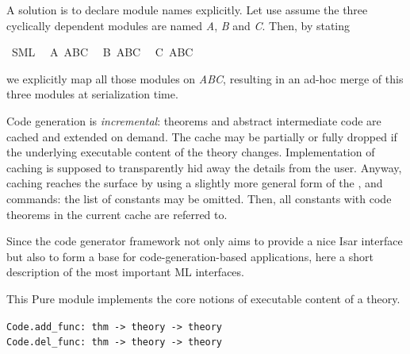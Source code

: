 \begin{isabellebody}
\begin{isamarkuptext}
  A solution is to declare module names explicitly.
  Let use assume the three cyclically dependent
  modules are named \emph{A}, \emph{B} and \emph{C}.
  Then, by stating%
\end{isamarkuptext}%
\isamarkuptrue%
\isamarkupfalse%
\ SML\isanewline
\ \ A\ ABC\isanewline
\ \ B\ ABC\isanewline
\ \ C\ ABC%
\begin{isamarkuptext}%
we explicitly map all those modules on \emph{ABC},
  resulting in an ad-hoc merge of this three modules
  at serialization time.%
\end{isamarkuptext}%
\isamarkuptrue%
%
\isamarkuptrue%
%
\begin{isamarkuptext}%
Code generation is \emph{incremental}: theorems
  and abstract intermediate code are cached and extended on demand.
  The cache may be partially or fully dropped if the underlying
  executable content of the theory changes.
  Implementation of caching is supposed to transparently
  hid away the details from the user.  Anyway, caching
  reaches the surface by using a slightly more general form
  of the \isa{{\isasymCODETHMS}}, \isa{{\isasymCODEDEPS}}
  and \isa{{\isasymEXPORTCODE}} commands: the list of constants
  may be omitted.  Then, all constants with code theorems
  in the current cache are referred to.%
\end{isamarkuptext}%
\isamarkuptrue%
%
\isamarkuptrue%
%
\begin{isamarkuptext}%
Since the code generator framework not only aims to provide
  a nice Isar interface but also to form a base for
  code-generation-based applications, here a short
  description of the most important ML interfaces.%
\end{isamarkuptext}%
\isamarkuptrue%
%
\isamarkuptrue%
%
\begin{isamarkuptext}%
This Pure module implements the core notions of
  executable content of a theory.%
\end{isamarkuptext}%
\isamarkuptrue%
%
\isamarkuptrue%
%
\isadelimmlref
%
\endisadelimmlref
%
\isatagmlref
%
\begin{isamarkuptext}%
\begin{mldecls}
  \verb|Code.add_func: thm -> theory -> theory| \\
  \verb|Code.del_func: thm -> theory -> theory| \\

\end{mldecls}
\end{isamarkuptext}
\end{isabellebody}
